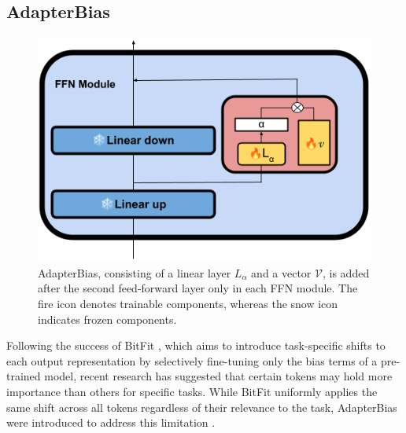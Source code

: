 

\subsection{AdapterBias}
\begin{figure}
    \begin{center}
        \includegraphics[scale=0.4]{imgs/AdapterBias.png}
        \caption{ AdapterBias, consisting of a linear layer $L_\alpha$ and a vector $\mathcal{V}$, is added after the second feed-forward layer only in each FFN module. The fire icon denotes trainable components, whereas the snow icon indicates frozen components.}
        \label{fig:AdapterBias}
    \end{center}
\end{figure}
Following the success of BitFit \cite{ben-zaken-etal-2022-bitfit}, which aims to introduce task-specific shifts to each output representation by selectively fine-tuning only the bias terms of a pre-trained model, recent research has suggested that certain tokens may hold more importance than others for specific tasks. While BitFit uniformly applies the same shift across all tokens regardless of their relevance to the task, AdapterBias were introduced to address this limitation \cite{fu-etal-2022-adapterbias}.

